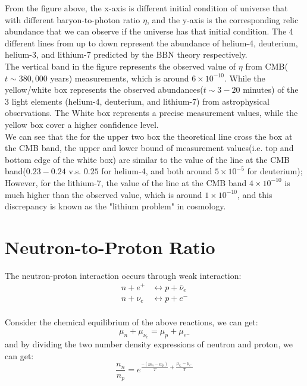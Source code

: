 \begin{extra}
    From the figure above, the x-axis is different initial condition of universe that with different baryon-to-photon ratio $\eta$, and the y-axis is the corresponding relic abundance that we can observe if the universe has that initial condition. The 4 different lines from up to down represent the abundance of helium-4, deuterium, helium-3, and lithium-7 predicted by the BBN theory respectively. \\

    The vertical band in the figure represents the observed value of $\eta$ from CMB($t \sim 380,000$ years) measurements, which is around $6 \times 10^{-10}$. While the yellow/white box represents the observed abundances($t \sim 3-20$ minutes) of the 3 light elements (helium-4, deuterium, and lithium-7) from astrophysical observations. The White box represents a precise measurement values, while the yellow box cover a higher confidence level. \\
    
    We can see that the for the upper two box the theoretical line cross the box at the CMB band, the upper and lower bound of measurement values(i.e. top and bottom edge of the white box) are similar to the value of the line at the CMB band($0.23-0.24$ v.s. $0.25$ for helium-4, and both around $5 \times 10^{-5}$ for deuterium); However, for the lithium-7, the value of the line at the CMB band $4\times 10^{-10}$ is much higher than the observed value, which is around $1 \times 10^{-10}$, and this discrepancy is known as the "lithium problem" in cosmology. \\
\end{extra}




\bigskip \noindent \bigskip \noindent \bigskip \noindent
\section{Neutron-to-Proton Ratio}
\begin{theory}
    The neutron-proton interaction occurs through weak interaction:
    \begin{align*}
        n + e^+ &\leftrightarrow p + \bar{\nu}_e \\
        n + \nu_e &\leftrightarrow p + e^- \\
    \end{align*}

    Consider the chemical equilibrium of the above reactions, we can get:
    \[
        \mu_n + \mu_{\nu_e} = \mu_p + \mu_{e^-}
    \]
    and by dividing the two number density expressions of neutron and proton, we can get:
    \[
        \frac{n_n}{n_p} = e^{\frac{-(m_n - m_p)}{T} + \frac{\mu_{\nu_e} - \mu_{e^-}}{T}} 
    \]
\end{theory}

